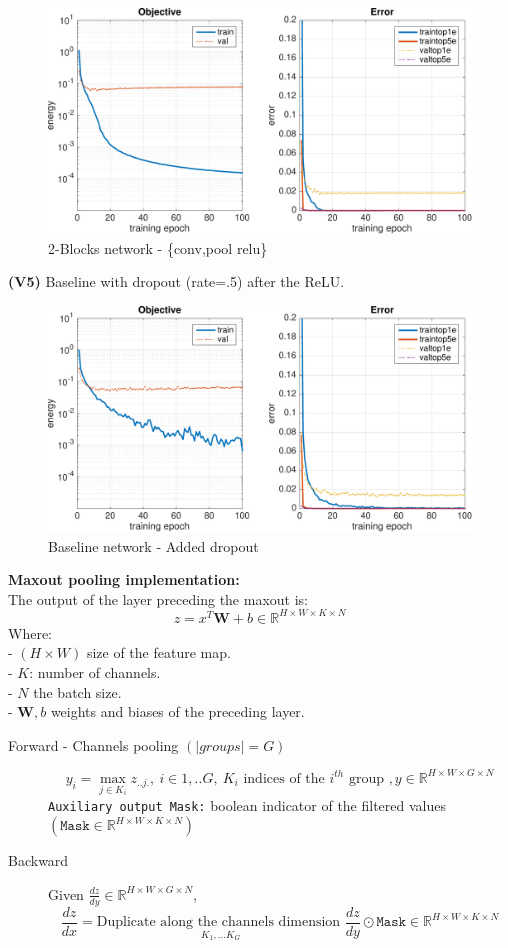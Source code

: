 \documentclass[11pt]{article}
\newcommand{\R}{\mathbb{R}}
\begin{document}
	\begin{figure}[H]
	    \centering
	    \includegraphics[width=15cm]{v4}
	    \caption{2-Blocks network - \{conv,pool relu\}}
	\end{figure}

\newpage
\textbf{(V5)} Baseline with dropout (rate=.5) after the ReLU.
	\begin{figure}[H]
	    \centering
	    \includegraphics[width=15cm]{v5}
	    \caption{Baseline network - Added dropout}
	\end{figure}

\textbf{Maxout pooling implementation:}\\
The output of the layer preceding the maxout is:
\[z=x^T\mathbf W+b\in\R^{H\times W\times K\times N}\]
Where:\\
- $(H\times W)$ size of the feature map.\\
- $K$: number of channels.\\
- $N$ the batch size.\\
- $\mathbf W, b$ weights and biases of the preceding layer. 
\begin{description}
\item[Forward - Channels pooling $(|groups|=G)$] \[y_i=\max_{j\in K_i}z_{..j.},\:i\in{1,..G},\:K_i\text{ indices of the $i^{th}$ group },y\in \R^{H\times W\times G\times N}\]
\texttt{Auxiliary output Mask:} boolean indicator of the filtered values $(\texttt{Mask}\in \R^{H\times W\times K\times N})$
\item[Backward] Given $\frac{dz}{dy}\in \R^{H\times W\times G\times N}$, 
\[\frac{dz}{dx}=\underset{K_1,...K_G}{\text{Duplicate along the channels dimension }} \frac{dz}{dy}\odot \texttt{Mask}\in\R^{H\times W\times K\times N}\]
\end{description}
\newpage
\end{document}
